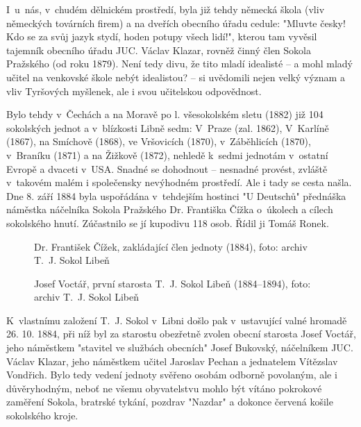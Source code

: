 \documentclass[a5paper, 12pt, twoside]{article}
\begin{document}
I~u~nás, v~chudém dělnickém prostředí, byla již tehdy německá škola (vliv německých továrních firem) a na dveřích obecního úřadu cedule: "Mluvte česky! Kdo se za svůj jazyk stydí, hoden potupy všech lidí!", kterou tam vyvěsil tajemník obecního úřadu JUC. Václav Klazar, rovněž činný člen Sokola Pražského (od roku 1879). Není tedy divu, že tito mladí idealisté – a mohl mladý učitel na venkovské škole nebýt idealistou? – si uvědomili nejen velký význam a vliv Tyršových myšlenek, ale i svou učitelskou odpovědnost.

Bylo tehdy v~Čechách a na Moravě po l. všesokolském sletu (1882) již 104 sokolských jednot a v~blízkosti Libně sedm: V~Praze (zal. 1862), V~Karlíně (1867), na Smíchově (1868), ve Vršovicích (1870), v~Záběhlicích (1870), v~Braníku (1871) a na Žižkově (1872), nehledě k~sedmi jednotám v~ostatní Evropě a dvaceti v~USA. Snadné se dohodnout -- nesnadné provést, zvláště v~takovém malém i společensky nevýhodném prostředí. Ale i tady se cesta našla. Dne 8. září 1884 byla uspořádána v~tehdejším hostinci "U Deutschů" přednáška náměstka náčelníka Sokola Pražského Dr. Františka Čížka o~úkolech a cílech sokolského hnutí. Zúčastnilo se jí kupodivu 118 osob. Řídil ji Tomáš Ronek.


\begin{figure*}[h]
  \centering
  \begin{subfigure}[c]{0.4\textwidth}
  \caption*{Dr. František Čížek, zakládající člen jednoty (1884), foto: archiv T.~J. Sokol Libeň }
  \end{subfigure}
  \hfill
  \begin{subfigure}[c]{0.5\textwidth}
  \caption*{Josef Voctář, první starosta T.~J. Sokol Libeň (1884–⁠⁠⁠⁠⁠⁠1894), foto: archiv T.~J. Sokol Libeň }
  \end{subfigure}
\end{figure*}

K~vlastnímu založení T.~J. Sokol v~Libni došlo pak v~ustavující valné hromadě 26. 10. 1884, při níž byl za starostu obezřetně zvolen obecní starosta Josef Voctář, jeho náměstkem "stavitel ve službách obecních" Josef Bukovský, náčelníkem JUC. Václav Klazar, jeho náměstkem učitel Jaroslav Pechan a jednatelem Vítězslav Vondřich. Bylo tedy vedení jednoty svěřeno osobám odborně povolaným, ale i důvěryhodným, neboť ne všemu obyvatelstvu mohlo být vítáno pokrokové zaměření Sokola, bratrské tykání, pozdrav "Nazdar" a dokonce červená košile sokolského kroje.
\end{document}
